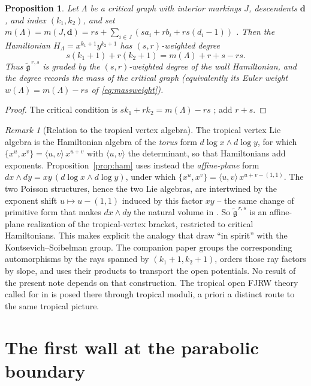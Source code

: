 \documentclass[11pt]{amsart}
\newtheorem{proposition}[theorem]{Proposition}
\theoremstyle{definition}
\theoremstyle{remark}
\newtheorem{remark}[theorem]{Remark}
\newcommand{\gfrak}{\mathfrak{g}}
\begin{document}
\begin{proposition}
\label{prop:grading}
Let $\Lambda$ be a critical graph with interior markings $J$, descendents
$\mathbf d$, and index $(k_{1},k_{2})$, and set
$m(\Lambda)=m(J,\mathbf d)=rs+\sum_{i\in J}(sa_{i}+rb_{i}+rs(d_{i}-1))$
\cite[Notation~2.30]{GKT}. Then the Hamiltonian $H_{\Lambda}=x^{k_{1}+1}y^{k_{2}+1}$
has $(s,r)$-weighted degree
\[
s(k_{1}+1)+r(k_{2}+1)=m(\Lambda)+r+s-rs .
\]
Thus $\widetilde{\gfrak}^{\,r,s}$ is graded by the $(s,r)$-weighted degree of
the wall Hamiltonian, and the degree records the mass of the critical graph
(equivalently its Euler weight $w(\Lambda)=m(\Lambda)-rs$ of
\eqref{eq:massweight}).
\end{proposition}

\begin{proof}
The critical condition is $sk_{1}+rk_{2}=m(\Lambda)-rs$
\cite[Proposition~2.39]{GKT}; add $r+s$.
\end{proof}

\begin{remark}[Relation to the tropical vertex algebra]
\label{rem:tropical}
The tropical vertex Lie algebra is the Hamiltonian algebra of the \emph{torus}
form $d\log x\wedge d\log y$, for which
$\{x^{u},x^{v}\}=\langle u,v\rangle\,x^{u+v}$ with $\langle u,v\rangle$ the
determinant, so that Hamiltonians add exponents. Proposition~\ref{prop:ham} uses
instead the \emph{affine-plane} form $dx\wedge dy=xy\,(d\log x\wedge d\log y)$,
under which $\{x^{u},x^{v}\}=\langle u,v\rangle\,x^{u+v-(1,1)}$. The two Poisson
structures, hence the two Lie algebras, are intertwined by the exponent shift
$u\mapsto u-(1,1)$ induced by this factor $xy$ -- the same change of primitive
form that makes $dx\wedge dy$ the natural volume in \cite[Theorem~0.3]{GKT}. So
$\widetilde{\gfrak}^{\,r,s}$ is an affine-plane realization of the
tropical-vertex bracket, restricted to critical Hamiltonians.  This makes
explicit the analogy that \cite[Remarks~0.8 and~4.20]{GKT} draw ``in spirit''
with the Kontsevich--Soibelman group.  The companion paper \cite{companion}
groups the corresponding automorphisms by the rays spanned by
$(k_1+1,k_2+1)$, orders those ray factors by slope, and uses their products to
transport the open potentials.  No result of the present note depends on that
construction.
The tropical open FJRW theory called for in \cite[\S6]{GKTsurvey} is posed
there through tropical moduli, a priori a distinct route to the same tropical
picture.
\end{remark}

\section{The first wall at the parabolic boundary}
\label{sec:parabolic}
\end{document}
